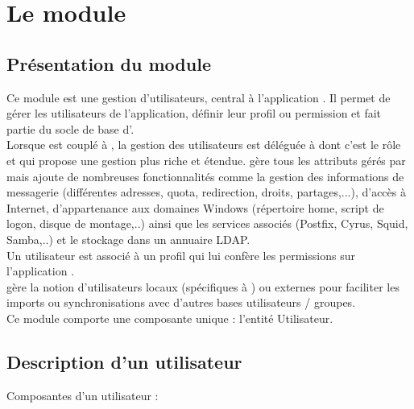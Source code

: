 
\clearpage
\section{Le module \user}

\subsection{Présentation du module \user}

Ce module est une gestion d'utilisateurs, central à l'application \obm.
Il permet de gérer les utilisateurs de l'application, définir leur profil ou permission et fait partie du socle de base d'\obm.\\

Lorsque \obm est couplé à \aliamin, la gestion des utilisateurs est déléguée à \aliamin dont c'est le rôle et qui propose une gestion plus riche et étendue.
\aliamin gère tous les attributs gérés par \obm mais ajoute de nombreuses fonctionnalités comme la gestion des informations de messagerie (différentes adresses, quota, redirection, droits, partages,...), d'accès à Internet, d'appartenance aux domaines Windows (répertoire home, script de logon, disque de montage,..) ainsi que les services associés (Postfix, Cyrus, Squid, Samba,..) et le stockage dans un annuaire LDAP.\\

Un utilisateur est associé à un profil qui lui confère les permissions sur l'application \obm.\\

\obm gère la notion d'utilisateurs locaux (spécifiques à \obm) ou externes pour faciliter les imports ou synchronisations avec d'autres bases utilisateurs / groupes.\\

Ce module comporte une composante unique : l'entité Utilisateur.


\subsection{Description d'un utilisateur}

Composantes d'un utilisateur :\\

